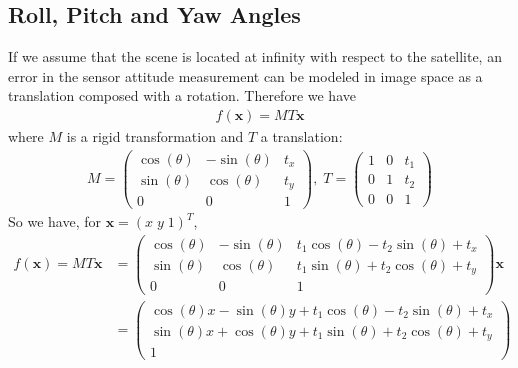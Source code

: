 \documentclass[paper=a4, fontsize=11pt]{article}
\begin{document}




\subsection{Roll, Pitch and Yaw Angles}
If we assume that the scene is located at infinity with respect to the satellite, an error in the sensor attitude measurement can be modeled in image space as a translation composed with a rotation. Therefore we have
\begin{align*}
f(\textbf{x}) = MT\textbf{x}
\end{align*}
where $M$ is a rigid transformation and $T$ a translation:\\
\begin{align*} 
M = 
\begin{pmatrix} 
\cos(\theta) & -\sin(\theta) & t_x \\
\sin(\theta) & \cos(\theta) & t_y \\
0 & 0 & 1
\end{pmatrix}, \; 
T = 
\begin{pmatrix} 
1 & 0 & t_1 \\
0 & 1 & t_2 \\
0 & 0 & 1
\end{pmatrix}
\end{align*}
So we have, for $ \textbf{x} = (  x \; y \; 1)^T $, 
\begin{align*}
f(\textbf{x}) = MT\textbf{x} &= 
\begin{pmatrix} 
\cos(\theta) & -\sin(\theta) & t_1\cos(\theta) - t_2\sin(\theta) + t_x \\
\sin(\theta) & \cos(\theta) & t_1\sin(\theta) + t_2\cos(\theta) + t_y \\
0 & 0 & 1
\end{pmatrix} \textbf{x}  \\
&= 
\begin{pmatrix} 
\cos(\theta)x -\sin(\theta)y + t_1\cos(\theta) - t_2\sin(\theta) + t_x \\
\sin(\theta)x + \cos(\theta)y + t_1\sin(\theta) + t_2\cos(\theta) + t_y \\
1
\end{pmatrix}
\end{align*}




\end{document}
